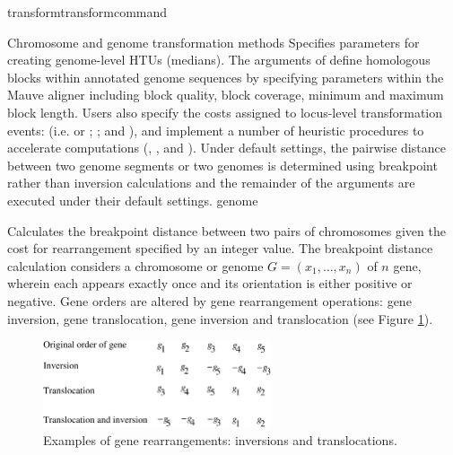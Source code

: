 \begin{command}{transform}{transformcommand}
\begin{arguments}
\begin{argumentgroup}{Chromosome and genome transformation methods}
                {Specifies parameters for creating genome-level HTUs (medians). 
                The arguments of  define 
                homologous blocks within annotated genome sequences by
                specifying parameters within the Mauve aligner \cite{darlingetal2004} 
                including block quality, block coverage, minimum and maximum block
                 length. Users also specify the costs assigned to locus-level transformation 
                 events: (i.e.   or 
                ; ; and 
                 ), and implement a number of heuristic 
                procedures to accelerate computations (, 
                , and ).  
                Under default settings, the pairwise distance between two genome 
                segments or two genomes is determined using breakpoint rather 
                than inversion calculations and the remainder of the arguments are executed 
                under their default settings.}
                {genome}

                {Calculates the breakpoint distance \cite{blanchetteetal1997}
                between two pairs of chromosomes given the cost for rearrangement
                specified by an integer value.  The breakpoint distance calculation considers
                a chromosome or genome $G = (x_1, \ldots, x_n) $ of $n$ gene, wherein each
                 appears exactly once and its orientation is either positive or negative.  Gene
                orders are altered by gene rearrangement operations: gene inversion, gene translocation,
                gene inversion and translocation (see Figure \ref{fig:genomeRearrangement}).  
                \bigskip
                 \begin{figure} [!htbp]
   		        \begin{center}
        		    \includegraphics[width=0.6\textwidth]{doc/figures/genomeRearrangement.pdf}
    		    \end{center}
    		    \caption{Examples of gene rearrangements: inversions and translocations.}
		        \label{fig:genomeRearrangement}
		    \end{figure}

}
\end{argumentgroup}
\end{arguments}
\end{command}
